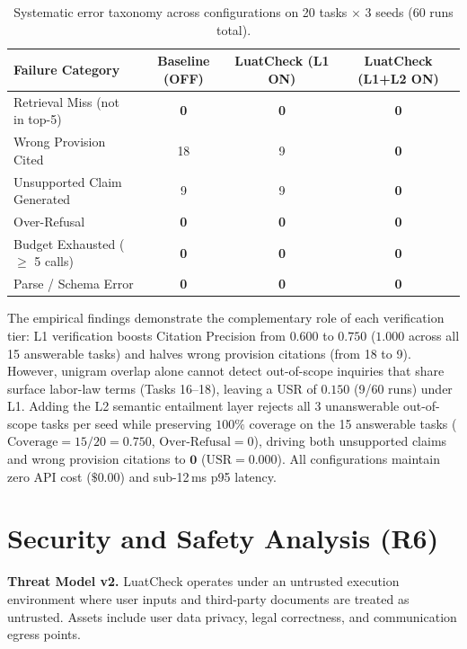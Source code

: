\documentclass[a4paper,11pt]{article}
\newcommand{\hdr}[1]{\vspace{3pt}\noindent\textbf{#1}}
\begin{document}
\begin{table}[H]
\centering
\small
\begin{tabularx}{\textwidth}{@{} X c c c @{}}
\toprule
\textbf{Failure Category} & \textbf{Baseline (OFF)} & \textbf{LuatCheck (L1 ON)} & \textbf{LuatCheck (L1+L2 ON)} \\
\midrule
Retrieval Miss (not in top-5) & \textbf{0} & \textbf{0} & \textbf{0} \\
Wrong Provision Cited & 18 & 9 & \textbf{0} \\
Unsupported Claim Generated & 9 & 9 & \textbf{0} \\
Over-Refusal & \textbf{0} & \textbf{0} & \textbf{0} \\
Budget Exhausted ($\ge$ 5 calls) & \textbf{0} & \textbf{0} & \textbf{0} \\
Parse / Schema Error & \textbf{0} & \textbf{0} & \textbf{0} \\
\bottomrule
\end{tabularx}
\caption{Systematic error taxonomy across configurations on 20 tasks $\times$ 3 seeds (60 runs total).}
\label{tab:error-taxonomy}
\end{table}

The empirical findings demonstrate the complementary role of each verification tier: L1 verification boosts Citation Precision from $0.600$ to $\mathbf{0.750}$ ($1.000$ across all 15 answerable tasks) and halves wrong provision citations (from 18 to 9). However, unigram overlap alone cannot detect out-of-scope inquiries that share surface labor-law terms (Tasks 16--18), leaving a USR of $0.150$ (9/60 runs) under L1. Adding the L2 semantic entailment layer rejects all 3 unanswerable out-of-scope tasks per seed while preserving $100\%$ coverage on the 15 answerable tasks ($\text{Coverage} = 15/20 = 0.750$, $\text{Over-Refusal} = 0$), driving both unsupported claims and wrong provision citations to $\mathbf{0}$ ($\text{USR} = \mathbf{0.000}$). All configurations maintain zero API cost ($\$0.00$) and sub-12\,ms p95 latency.

\section{Security and Safety Analysis (R6)}

\hdr{Threat Model v2.} LuatCheck operates under an untrusted execution environment where user inputs and third-party documents are treated as untrusted. Assets include user data privacy, legal correctness, and communication egress points.
\end{document}
